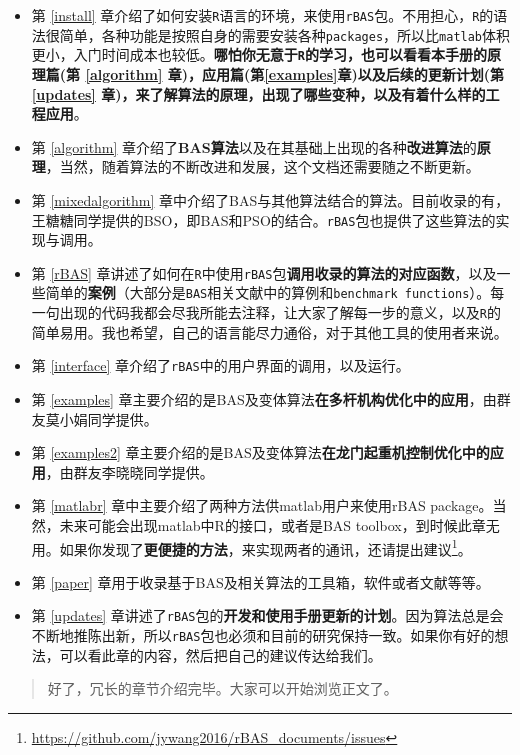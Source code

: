 \documentclass[]{ctexbook}
\renewcommand{\href}[2]{#2\footnote{\url{#1}}}
\theoremstyle{definition}
\theoremstyle{definition}
\theoremstyle{definition}
\theoremstyle{remark}
\begin{document}
\begin{itemize}
\item
  第 \ref{install}
  章介绍了如何安装\texttt{R}语言的环境，来使用\texttt{rBAS}包。不用担心，\texttt{R}的语法很简单，各种功能是按照自身的需要安装各种\texttt{packages}，所以比\texttt{matlab}体积更小，入门时间成本也较低。\textbf{哪怕你无意于\texttt{R}的学习，也可以看看本手册的原理篇(第
  \ref{algorithm} 章)，应用篇(第\ref{examples}章)以及后续的更新计划(第
  \ref{updates}
  章)，来了解算法的原理，出现了哪些变种，以及有着什么样的工程应用}。
\item
  第 \ref{algorithm}
  章介绍了\textbf{BAS算法}以及在其基础上出现的各种\textbf{改进算法}的\textbf{原理}，当然，随着算法的不断改进和发展，这个文档还需要随之不断更新。
\item
  第 \ref{mixedalgorithm}
  章中介绍了BAS与其他算法结合的算法。目前收录的有，王糖糖同学提供的BSO，即BAS和PSO的结合。\texttt{rBAS}包也提供了这些算法的实现与调用。
\item
  第 \ref{rBAS}
  章讲述了如何在\texttt{R}中使用\texttt{rBAS}包\textbf{调用收录的算法的对应函数}，以及一些简单的\textbf{案例}（大部分是\texttt{BAS}相关文献中的算例和\texttt{benchmark\ functions}）。每一句出现的代码我都会尽我所能去注释，让大家了解每一步的意义，以及\texttt{R}的简单易用。我也希望，自己的语言能尽力通俗，对于其他工具的使用者来说。
\item
  第 \ref{interface} 章介绍了\texttt{rBAS}中的用户界面的调用，以及运行。
\item
  第 \ref{examples}
  章主要介绍的是BAS及变体算法\textbf{在多杆机构优化中的应用}，由群友莫小娟同学提供。
\item
  第 \ref{examples2}
  章主要介绍的是BAS及变体算法\textbf{在龙门起重机控制优化中的应用}，由群友李晓晓同学提供。
\item
  第 \ref{matlabr} 章中主要介绍了两种方法供matlab用户来使用rBAS
  package。当然，未来可能会出现matlab中R的接口，或者是BAS
  toolbox，到时候此章无用。如果你发现了\textbf{更便捷的方法}，来实现两者的通讯，还请\href{https://github.com/jywang2016/rBAS_documents/issues}{提出建议}。
\item
  第 \ref{paper} 章用于收录基于BAS及相关算法的工具箱，软件或者文献等等。
\item
  第 \ref{updates}
  章讲述了\texttt{rBAS}包的\textbf{开发和使用手册更新的计划}。因为算法总是会不断地推陈出新，所以\texttt{rBAS}包也必须和目前的研究保持一致。如果你有好的想法，可以看此章的内容，然后把自己的建议传达给我们。
\end{itemize}

\begin{quote}
好了，冗长的章节介绍完毕。大家可以开始浏览正文了。
\end{quote}
\end{document}
